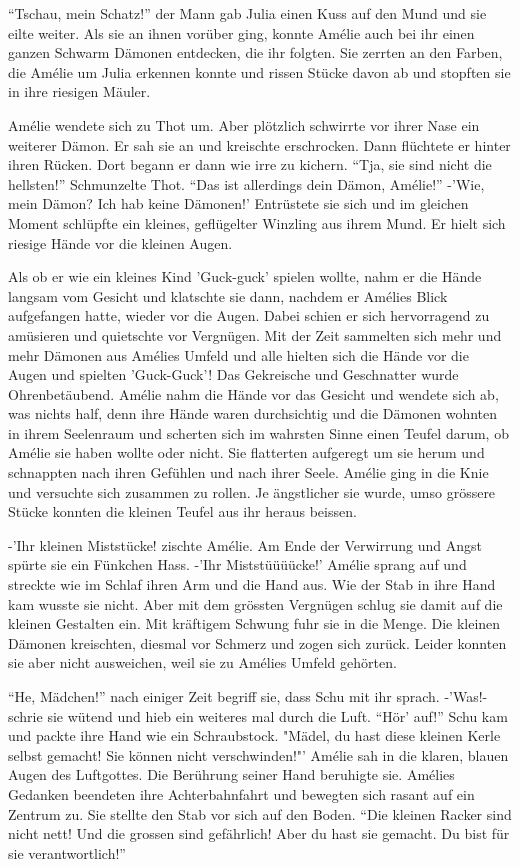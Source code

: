 \documentclass[11pt,titlepage,a5paper]{book}
\begin{document}
"`Tschau, mein Schatz!"' der Mann gab Julia einen Kuss auf den Mund und sie eilte weiter. Als sie an ihnen vorüber ging, konnte Amélie auch bei ihr einen ganzen Schwarm Dämonen entdecken, die ihr folgten. Sie zerrten an den Farben, die Amélie um Julia erkennen konnte und rissen Stücke davon ab und stopften sie in ihre riesigen Mäuler. 

Amélie wendete sich zu Thot um. Aber plötzlich schwirrte vor ihrer Nase ein weiterer Dämon. Er sah sie an und kreischte erschrocken. Dann flüchtete er hinter ihren Rücken. Dort begann er dann wie irre zu kichern. "`Tja, sie sind nicht die hellsten!"' Schmunzelte Thot. "`Das ist allerdings dein Dämon, Amélie!"' -'Wie, mein Dämon? Ich hab keine Dämonen!' Entrüstete sie sich und im gleichen Moment schlüpfte ein kleines, geflügelter Winzling aus ihrem Mund. Er hielt sich riesige Hände vor die kleinen Augen. 

Als ob er wie ein kleines Kind 'Guck-guck' spielen wollte, nahm er die Hände langsam vom Gesicht und klatschte sie dann, nachdem er Amélies Blick aufgefangen hatte, wieder vor die Augen. Dabei schien er sich hervorragend zu amüsieren und quietschte vor Vergnügen. Mit der Zeit sammelten sich mehr und mehr Dämonen aus Amélies Umfeld und alle hielten sich die Hände vor die Augen und spielten 'Guck-Guck'! Das Gekreische und Geschnatter wurde Ohrenbetäubend. Amélie nahm die Hände vor das Gesicht und wendete sich ab, was nichts half, denn ihre Hände waren durchsichtig und die Dämonen wohnten in ihrem Seelenraum und scherten sich im wahrsten Sinne einen Teufel darum, ob Amélie sie haben wollte oder nicht. Sie flatterten aufgeregt um sie herum und schnappten nach ihren Gefühlen und nach ihrer Seele. Amélie ging in die Knie und versuchte sich zusammen zu rollen. Je ängstlicher sie wurde, umso grössere Stücke konnten die kleinen Teufel aus ihr heraus beissen.

-'Ihr kleinen Miststücke! zischte Amélie. Am Ende der Verwirrung und Angst spürte sie ein Fünkchen Hass. -'Ihr Miststüüüücke!' Amélie sprang auf und streckte wie im Schlaf ihren Arm und die Hand aus. Wie der Stab in ihre Hand kam wusste sie nicht. Aber mit dem grössten Vergnügen schlug sie damit auf die kleinen Gestalten ein. Mit kräftigem Schwung fuhr sie in die Menge. Die kleinen Dämonen kreischten, diesmal vor Schmerz und zogen sich zurück. Leider konnten sie aber nicht ausweichen, weil sie zu Amélies Umfeld gehörten.

"`He, Mädchen!"' nach einiger Zeit begriff sie, dass Schu mit ihr sprach. -'Was!- schrie sie wütend und hieb ein weiteres mal durch die Luft. "`Hör' auf!"' Schu kam und packte ihre Hand wie ein Schraubstock. "Mädel, du hast diese kleinen Kerle selbst gemacht! Sie können nicht verschwinden!"' Amélie sah in die klaren, blauen Augen des Luftgottes. Die Berührung seiner Hand beruhigte sie. Amélies Gedanken beendeten ihre Achterbahnfahrt und bewegten sich rasant auf ein Zentrum zu. Sie stellte den Stab vor sich auf den Boden. "`Die kleinen Racker sind nicht nett! Und die grossen sind gefährlich! Aber du hast sie gemacht. Du bist für sie verantwortlich!"'
\end{document}
